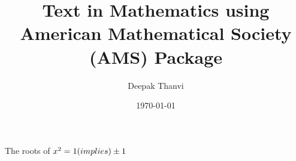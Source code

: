 \documentclass{article}
\title{Text in Mathematics using American Mathematical Society (AMS) Package}
\author{Deepak Thanvi}
\date{\today}
\begin{document}
\maketitle

The roots of 
\(
	x^2 = 1 \text (implies) \pm 1
\)
\end{document}

